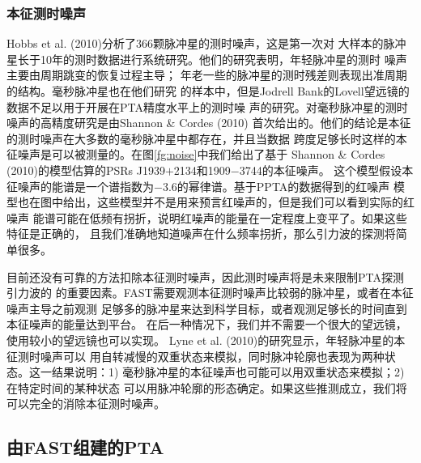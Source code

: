 \subsubsection{本征测时噪声}

Hobbs et al. (2010)\supercite{hlk10}分析了366颗脉冲星的测时噪声，这是第一次对
大样本的脉冲星长于10年的测时数据进行系统研究。他们的研究表明，年轻脉冲星的测时
噪声主要由周期跳变的恢复过程主导；
年老一些的脉冲星的测时残差则表现出准周期的结构。毫秒脉冲星也在他们研究
的样本中，但是Jodrell Bank的Lovell望远镜的数据不足以用于开展在PTA精度水平上的测时噪
声的研究。对毫秒脉冲星的测时噪声的高精度研究是由Shannon \& Cordes (2010)\supercite{Shannon10}
首次给出的。他们的结论是本征的测时噪声在大多数的毫秒脉冲星中都存在，并且当数据
跨度足够长时这样的本征噪声是可以被测量的。在图\ref{fg:noise}中我们给出了基于
Shannon \& Cordes (2010)的模型估算的PSRs J1939$+$2134和1909$-$3744的本征噪声。
这个模型假设本征噪声的能谱是一个谱指数为$-3.6$的幂律谱。基于PPTA的数据得到的红噪声
模型也在图中给出，这些模型并不是用来预言红噪声的，但是我们可以看到实际的红噪声
能谱可能在低频有拐折，说明红噪声的能量在一定程度上变平了。如果这些特征是正确的，
且我们准确地知道噪声在什么频率拐折，那么引力波的探测将简单很多。

目前还没有可靠的方法扣除本征测时噪声，因此测时噪声将是未来限制PTA探测引力波的
的重要因素。FAST需要观测本征测时噪声比较弱的脉冲星，或者在本征噪声主导之前观测
足够多的脉冲星来达到科学目标，或者观测足够长的时间直到本征噪声的能量达到平台。
在后一种情况下，我们并不需要一个很大的望远镜，使用较小的望远镜也可以实现。
Lyne et al. (2010)\supercite{lhk+10}的研究显示，年轻脉冲星的本征测时噪声可以
用自转减慢的双重状态来模拟，同时脉冲轮廓也表现为两种状态。这一结果说明：1) 
毫秒脉冲星的本征噪声也可能可以用双重状态来模拟；2) 在特定时间的某种状态
可以用脉冲轮廓的形态确定。如果这些推测成立，我们将可以完全的消除本征测时噪声。

\subsection{由FAST组建的PTA}

